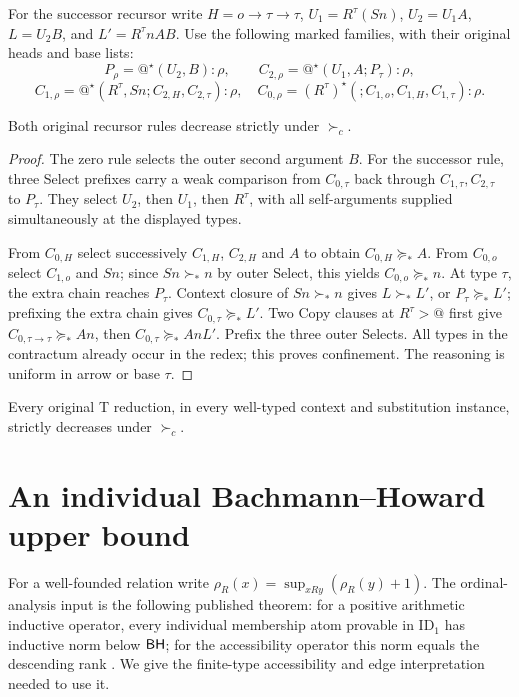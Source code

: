 \documentclass[11pt,a4paper]{article}
\newcommand{\rk}{\rho}
\begin{document}
For the successor recursor write $H=o\to\tau\to\tau$,
$U_1=R^\tau(Sn)$, $U_2=U_1A$, $L=U_2B$, and $L'=R^\tau nAB$.
Use the following marked families, with their original heads and base lists:
\[
 P_\rho=@^\star(U_2,B):\rho,\qquad
 C_{2,\rho}=@^\star(U_1,A;P_\tau):\rho,
\]
\[
 C_{1,\rho}=@^\star(R^\tau,Sn;C_{2,H},C_{2,\tau}):\rho,
 \quad C_{0,\rho}=(R^\tau)^\star(;C_{1,o},C_{1,H},C_{1,\tau}):\rho.
\]
\begin{lemma}\label{lem:recursor}
Both original recursor rules decrease strictly under $\succ_c$.
\end{lemma}
\begin{proof}
The zero rule selects the outer second argument $B$.
For the successor rule, three Select prefixes carry a weak comparison from
$C_{0,\tau}$ back through $C_{1,\tau},C_{2,\tau}$ to $P_\tau$.
They select $U_2$, then $U_1$, then $R^\tau$, with all self-arguments supplied
simultaneously at the displayed types.

From $C_{0,H}$ select successively $C_{1,H}$, $C_{2,H}$ and $A$ to obtain
$C_{0,H}\succeq_*A$.  From $C_{0,o}$ select $C_{1,o}$ and $Sn$; since
$Sn\succ_*n$ by outer Select, this yields $C_{0,o}\succeq_*n$.
At type $\tau$, the extra chain reaches $P_\tau$.  Context closure of
$Sn\succ_*n$ gives $L\succ_*L'$, or $P_\tau\succeq_*L'$; prefixing
the extra chain gives $C_{0,\tau}\succeq_*L'$.
Two Copy clauses at $R^\tau>@$ first give
$C_{0,\tau\to\tau}\succeq_*An$, then
$C_{0,\tau}\succeq_*AnL'$.  Prefix the three outer Selects.
All types in the contractum already occur in the redex; this proves confinement.
The reasoning is uniform in arrow or base $\tau$.
\end{proof}
\begin{corollary}
Every original T reduction, in every well-typed context and substitution
instance, strictly decreases under $\succ_c$.
\end{corollary}

\section{An individual Bachmann--Howard upper bound}\label{sec:upper}
For a well-founded relation write
$\rk_R(x)=\sup_{xRy}(\rk_R(y)+1)$.
The ordinal-analysis input is the following published theorem: for a positive
arithmetic inductive operator, every individual membership atom provable in
$\mathrm{ID}_1$ has inductive norm below $\mathsf{BH}$; for the accessibility operator
this norm equals the descending rank
\cite[Lemma 6.5.2, Definition 9.1.2 and Theorems 9.5.5--9.5.6]{pohlers}.
We give the finite-type accessibility and edge interpretation needed to use it.
\end{document}
